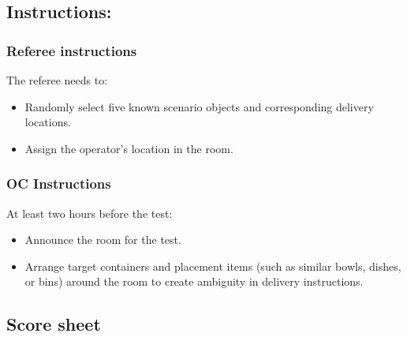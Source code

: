 \subsection*{Instructions:}
\subsubsection*{Referee instructions}

The referee needs to:
\begin{itemize}[nosep]
	\item Randomly select five known scenario objects and corresponding delivery locations.
	\item Assign the operator's location in the room.
\end{itemize}

\subsubsection*{OC Instructions}
At least two hours before the test:
\begin{itemize}[nosep]
	\item Announce the room for the test.
	\item Arrange target containers and placement items (such as similar bowls, dishes, or bins) around the room to create ambiguity in delivery instructions.
\end{itemize}

\subsection*{Score sheet}

